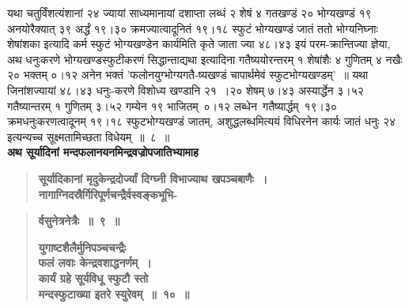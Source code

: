 \documentclass[11pt, openany]{book}
\begin{document}
 यथा चतुर्विंशत्यंशानां २४ ज्यायां साध्यमानायां दशाप्ता लब्धं २ शेषं ४ गतखण्डं २० भोग्यखण्डं १९ अनयोरैक्यात् ३९ अर्द्धं १९।३० क्रमज्यात्वादूनितं १९।१८ स्फुटं भोग्यखण्डं जातं ततो भोग्यनिघ्नाः शेषांशका इत्यादि कर्म स्फुटं भोग्यखण्डेन कार्यमिति कृते जाता ज्या ४८।४३ इयं परम-क्रान्तिज्या ज्ञेया, अथ धनुःकरणे भोग्यखण्डस्फुटीकरणं {\color{violet}सिद्धान्ता}द्यथा इत्यादिना गतैष्ययोरन्तरम् १ शेषांशैः ४ गुणितम् ४ नखैः २० भक्तम् ०।१२ अनेन भक्तं {\color{violet}'फलोनयुग्भोग्यगतै-ष्यखण्डं चापार्थमेवं स्फुटभोग्यखण्डम्'~॥} यथा जिनांशज्यायां ४८।४३ धनुः-करणे विशोध्य खण्डानि २१~।२० शेषम् ७।४३ अस्यार्द्धेन ३।५२ गतैष्यान्तरम् १ \;गुणितम् \;३।५२ \;गम्येन \;१९ \;भाजितम् \,०।१२ \;लब्धेन \,गतैष्यार्द्धम् \,१९।३० क्रमधनुःकरणत्वादूनम् १९।१८ स्फुटभोग्यखण्डं जातम्, अशुद्धलब्धमित्ययं विधिरनेन कार्यः जातं धनुः २४ इत्यन्यच्च सूक्ष्मतामिच्छता विधेयम्~॥~८~॥\\

{\small \textbf{अथ सूर्यादिनां मन्दफलानयनमिन्द्रवज्रोपजातिभ्यामाह\textendash }}

 \label{2.9}
\begin{quote}
{\large \textbf{{\color{purple}सूर्यादिकानां मृदुकेन्द्रदोर्ज्यां दिग्घ्नी विभाज्याथ खपञ्चबाणैः~। \\
नागाग्निदस्रैर्गिरिपूर्णचन्द्रैर्वस्वङ्कभूभि-}}}
\end{quote}

\newpage

 \label{2.10}
\begin{quote}
{\large \textbf{{\color{purple}र्वसुनेत्रनेत्रैः~॥~९~॥}}
\vspace{1mm}

\textbf{{\color{purple}युगाष्टशैलैर्मुनिपञ्चचन्द्रैः \\
फलं लवाः केन्द्रवशाद्धनर्णम्~। \\
कार्यं ग्रहे सूर्यविधू स्फुटौ स्तो \\
मन्दस्फुटाख्या इतरे स्युरेवम्~॥~१०~॥}}}
\end{quote}
\end{document}
